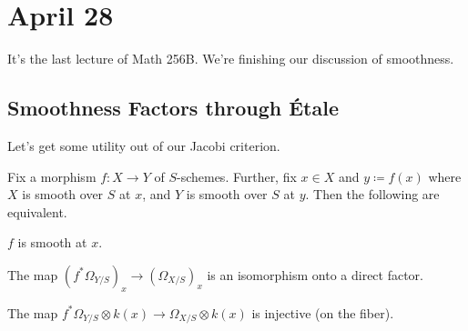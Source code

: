 \documentclass[../notes.tex]{subfiles}
\begin{document}
\section{April 28}

It's the last lecture of Math 256B. We're finishing our discussion of smoothness.

\subsection{Smoothness Factors through \'Etale}
Let's get some utility out of our Jacobi criterion.
\begin{proposition} \label{prop:smooth-by-fibers}
	Fix a morphism $f\colon X\to Y$ of $S$-schemes. Further, fix $x\in X$ and $y\coloneqq f(x)$ where $X$ is smooth over $S$ at $x$, and $Y$ is smooth over $S$ at $y$. Then the following are equivalent.
	\begin{listalph}
		\item $f$ is smooth at $x$.
		\item The map $(f^*\Omega_{Y/S})_x\to(\Omega_{X/S})_x$ is an isomorphism onto a direct factor.
		\item The map $f^*\Omega_{Y/S}\otimes k(x)\to\Omega_{X/S}\otimes k(x)$ is injective (on the fiber).
	\end{listalph}
\end{proposition}
\end{document}
